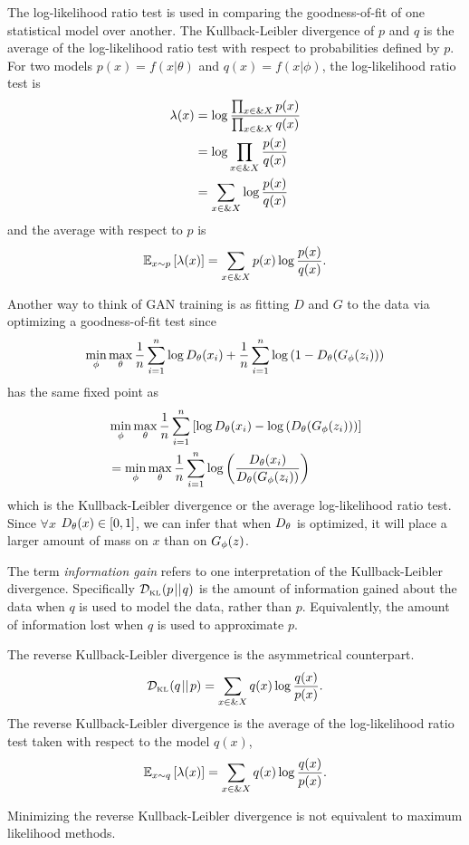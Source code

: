 \begin{remark}
  The log-likelihood ratio test is used in comparing the goodness-of-fit of one
  statistical model over another. The Kullback-Leibler divergence of $p$ and $q$
  is the average of the log-likelihood ratio test with respect to probabilities
  defined by $p$. For two models $p(x) = f(x|\theta)$ and $q(x) = f(x|\phi)$,
  the log-likelihood ratio test is
  \begin{align}
    \lambda(x) & = \log{\prod_{x \in \&X} p(x) \over \prod_{x \in \&X} q(x)} \\
               & = \log \prod_{x \in \&X} {p(x) \over q(x)} \\
               & = \sum_{x \in \&X} \log {p(x) \over q(x)}
  \end{align}
  and the average with respect to $p$ is
  \begin{align}
    \mathbb{E}_{x \sim p}\left[ \lambda(x) \right] = \sum_{x \in \&X} p(x)\log {p(x) \over q(x)}.
  \end{align}
\end{remark}

Another way to think of GAN training is as fitting $D$ and $G$ to the
data via optimizing a goodness-of-fit test since
\begin{align}
  \min_\phi\max_\theta{1 \over n} \sum_{i=1}^n \log{D_\theta(x_i)} + {1
    \over n} \sum_{i=1}^n\log{(1 - D_\theta(G_\phi(z_i)))}
\end{align}
has the same fixed point as
\begin{align}
  & \min_\phi\max_\theta{1 \over n} \sum_{i=1}^n \left[\log{D_\theta(x_i)} - \log{(D_\theta(G_\phi(z_i)))}\right] \\
  & = \min_\phi\max_\theta{1 \over n} \sum_{i=1}^n \log{\left({D_\theta(x_i) \over D_\theta(G_\phi(z_i))}\right)}
\end{align}
which is the Kullback-Leibler divergence or the average log-likelihood ratio
test. Since $\forall x$ $D_\theta(x) \in [0, 1]$, we can infer that when $D_\theta$ is
optimized, it will place a larger amount of mass on $x$ than on $G_\phi(z)$.

The term \textit{information gain} refers to one interpretation of the
Kullback-Leibler divergence. Specifically $\KL{p}{q}$ is the amount of
information gained about the data when $q$ is used to model the data, rather
than $p$. Equivalently, the amount of information lost when $q$ is used to
approximate $p$.

\begin{definition}
  The \textnormal{\sffamily reverse Kullback-Leibler divergence} is the asymmetrical
  counterpart.
  \begin{align}
    \label{eq:reverse-KL}
    \KL{q}{p} = \sum_{x \in \&X} q(x) \log{q(x) \over p(x)}.
  \end{align}
  The reverse Kullback-Leibler divergence is the average of the log-likelihood
  ratio test taken with respect to the model $q(x)$,
  \begin{align}
    \mathbb{E}_{x \sim q}\left[ \lambda(x) \right] = \sum_{x \in \&X} q(x)\log {q(x) \over p(x)}.
  \end{align}
\end{definition}
Minimizing the reverse Kullback-Leibler divergence is not equivalent to maximum
likelihood methods.

